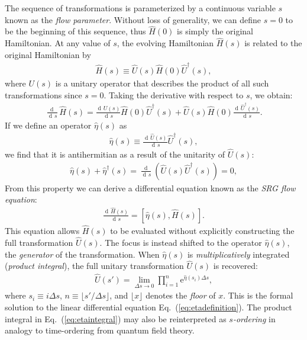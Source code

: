 \documentclass[aip, jcp, 12pt]{revtex4-1}
\newcommand{\D}{\operatorname{d\!}}
\begin{document}
The sequence of transformations is parameterized by a continuous variable $s$ known as the \textit{flow parameter}.  Without loss of generality, we can define $s = 0$ to be the beginning of this sequence, thus $\hat{H}(0)$ is simply the original Hamiltonian.  At any value of $s$, the evolving Hamiltonian $\hat{H}(s)$ is related to the original Hamiltonian by
\begin{align*}
  \hat{H}(s) \equiv \hat{U}(s) \hat{H}(0) \hat{U}^\dagger(s),
\end{align*}
where $U(s)$ is a unitary operator that describes the product of all such transformations since $s = 0$.  Taking the derivative with respect to $s$, we obtain:
\begin{align*}
  \frac{\D}{\D s} \hat{H}(s) = \frac{\D \hat{U}(s)}{\D s} \hat{H}(0) \hat{U}^\dagger(s) + \hat{U}(s) \hat{H}(0) \frac{\D \hat{U}^\dagger (s)}{\D s}.
\end{align*}
If we define an operator $\hat{\eta}(s)$ as
\begin{align} \label{eq:etadefinition}
  \hat{\eta}(s) \equiv \frac{\D \hat{U}(s)}{\D s} \hat{U}^\dagger(s),
\end{align}
we find that it is antihermitian as a result of the unitarity of $\hat{U}(s)$:
\begin{align*}
  \hat{\eta}(s) + \hat{\eta}^\dagger(s)
  = \frac{\D}{\D s} \left(\hat{U}(s) \hat{U}^\dagger(s)\right)
  = 0,
\end{align*}
From this property we can derive a differential equation known as the \textit{SRG flow equation}:
\begin{align} \label{eq:imsrgode}
  \frac{\D \hat{H}(s)}{\D s} = [\hat{\eta}(s), \hat{H}(s)].
\end{align}
This equation allows $\hat{H}(s)$ to be evaluated without explicitly constructing the full transformation $\hat U(s)$.  The focus is instead shifted to the operator $\hat \eta(s)$, the \textit{generator} of the transformation.  When $\hat \eta(s)$ is \emph{multiplicatively} integrated (\textit{product integral}), the full unitary transformation $\hat U(s)$ is recovered:
\begin{align} \label{eq:etaintegral}
  \hat U(s')
  = \lim_{\Delta s \to 0} \prod_{i = 1}^n \mathrm{e}^{\hat{\eta}(s_i) \Delta s},
\end{align}
where $s_i \equiv i \Delta s$, $n \equiv \lfloor s' / \Delta s \rfloor$, and $\lfloor x \rfloor$ denotes the \textit{floor} of $x$.  This is the formal solution to the linear differential equation Eq.\ (\ref{eq:etadefinition}).  The product integral in Eq.\ (\ref{eq:etaintegral}) may also be reinterpreted as \textit{$s$-ordering} \cite{reimann2013quantum} in analogy to time-ordering from quantum field theory.
\end{document}
